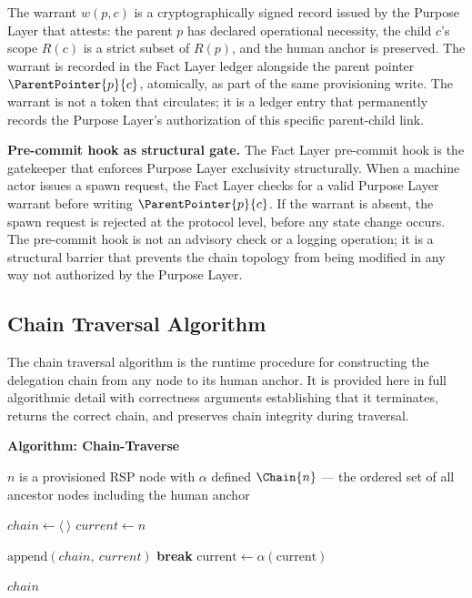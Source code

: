 The warrant $w(p, c)$ is a cryptographically signed record issued by the Purpose Layer that attests: the parent $p$ has declared operational necessity, the child $c$'s scope $R(c)$ is a strict subset of $R(p)$, and the human anchor is preserved. The warrant is recorded in the Fact Layer ledger alongside the parent pointer $\ParentPointer{p}{c}$, atomically, as part of the same provisioning write. The warrant is not a token that circulates; it is a ledger entry that permanently records the Purpose Layer's authorization of this specific parent-child link.

\bigskip
\noindent\textbf{Pre-commit hook as structural gate.} The Fact Layer pre-commit hook is the gatekeeper that enforces Purpose Layer exclusivity structurally. When a machine actor issues a spawn request, the Fact Layer checks for a valid Purpose Layer warrant before writing $\ParentPointer{p}{c}$. If the warrant is absent, the spawn request is rejected at the protocol level, before any state change occurs. The pre-commit hook is not an advisory check or a logging operation; it is a structural barrier that prevents the chain topology from being modified in any way not authorized by the Purpose Layer.

\subsection{Chain Traversal Algorithm}
\label{sec:chain-traversal-algorithm}

The chain traversal algorithm is the runtime procedure for constructing the delegation chain from any node to its human anchor. It is provided here in full algorithmic detail with correctness arguments establishing that it terminates, returns the correct chain, and preserves chain integrity during traversal.

\bigskip
\noindent\textbf{Algorithm: Chain-Traverse}

\begin{algorithm}
\caption{Chain-Traverse($n$) --- Build the delegation chain from node $n$ to the human anchor}
\label{alg:chain-traverse}
\begin{algorithmic}[1]
\REQUIRE $n$ is a provisioned RSP node with $\alpha$ defined
\ENSURE $\Chain{n}$ --- the ordered set of all ancestor nodes including the human anchor

\STATE $chain \leftarrow \langle\ \rangle$ 
\STATE $current \leftarrow n$ 

    \STATE $\text{append}(chain,\ current)$ 
        \STATE \textbf{break} 
    \ENDIF
    \STATE $\text{current} \leftarrow \alpha(\text{current})$ 
\ENDWHILE

\RETURN $chain$
\end{algorithmic}
\end{algorithm}

